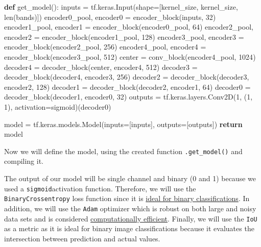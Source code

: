 \documentclass[
  letterpaper,
  DIV=11,
  numbers=noendperiod]{scrreprt}
\newenvironment{Shaded}{\begin{snugshade}}{\end{snugshade}}
\newcommand{\BuiltInTok}[1]{\textcolor[rgb]{0.00,0.23,0.31}{#1}}
\newcommand{\ControlFlowTok}[1]{\textcolor[rgb]{0.00,0.23,0.31}{\textbf{#1}}}
\newcommand{\DecValTok}[1]{\textcolor[rgb]{0.68,0.00,0.00}{#1}}
\newcommand{\KeywordTok}[1]{\textcolor[rgb]{0.00,0.23,0.31}{\textbf{#1}}}
\newcommand{\NormalTok}[1]{\textcolor[rgb]{0.00,0.23,0.31}{#1}}
\newcommand{\OperatorTok}[1]{\textcolor[rgb]{0.37,0.37,0.37}{#1}}
\newcommand{\StringTok}[1]{\textcolor[rgb]{0.13,0.47,0.30}{#1}}
\begin{document}
\begin{Shaded}
\begin{Highlighting}[]
\KeywordTok{def}\NormalTok{ get\_model():}
\NormalTok{    inputs }\OperatorTok{=}\NormalTok{ tf.keras.Input(shape}\OperatorTok{=}\NormalTok{[kernel\_size, kernel\_size, }\BuiltInTok{len}\NormalTok{(bands)])}
\NormalTok{    encoder0\_pool, encoder0 }\OperatorTok{=}\NormalTok{ encoder\_block(inputs, }\DecValTok{32}\NormalTok{)}
\NormalTok{    encoder1\_pool, encoder1 }\OperatorTok{=}\NormalTok{ encoder\_block(encoder0\_pool, }\DecValTok{64}\NormalTok{)}
\NormalTok{    encoder2\_pool, encoder2 }\OperatorTok{=}\NormalTok{ encoder\_block(encoder1\_pool, }\DecValTok{128}\NormalTok{)}
\NormalTok{    encoder3\_pool, encoder3 }\OperatorTok{=}\NormalTok{ encoder\_block(encoder2\_pool, }\DecValTok{256}\NormalTok{)}
\NormalTok{    encoder4\_pool, encoder4 }\OperatorTok{=}\NormalTok{ encoder\_block(encoder3\_pool, }\DecValTok{512}\NormalTok{)}
\NormalTok{    center }\OperatorTok{=}\NormalTok{ conv\_block(encoder4\_pool, }\DecValTok{1024}\NormalTok{)}
\NormalTok{    decoder4 }\OperatorTok{=}\NormalTok{ decoder\_block(center, encoder4, }\DecValTok{512}\NormalTok{)}
\NormalTok{    decoder3 }\OperatorTok{=}\NormalTok{ decoder\_block(decoder4, encoder3, }\DecValTok{256}\NormalTok{)}
\NormalTok{    decoder2 }\OperatorTok{=}\NormalTok{ decoder\_block(decoder3, encoder2, }\DecValTok{128}\NormalTok{)}
\NormalTok{    decoder1 }\OperatorTok{=}\NormalTok{ decoder\_block(decoder2, encoder1, }\DecValTok{64}\NormalTok{)}
\NormalTok{    decoder0 }\OperatorTok{=}\NormalTok{ decoder\_block(decoder1, encoder0, }\DecValTok{32}\NormalTok{)}
\NormalTok{    outputs }\OperatorTok{=}\NormalTok{ tf.keras.layers.Conv2D(}\DecValTok{1}\NormalTok{, (}\DecValTok{1}\NormalTok{, }\DecValTok{1}\NormalTok{), activation}\OperatorTok{=}\StringTok{\textquotesingle{}sigmoid\textquotesingle{}}\NormalTok{)(decoder0)}

\NormalTok{    model }\OperatorTok{=}\NormalTok{ tf.keras.models.Model(inputs}\OperatorTok{=}\NormalTok{[inputs], outputs}\OperatorTok{=}\NormalTok{[outputs])}
    \ControlFlowTok{return}\NormalTok{ model}
\end{Highlighting}
\end{Shaded}

Now we will define the model, using the created function
\texttt{.get\_model()} and compiling it.

The output of our model will be single channel and binary (0 and 1)
because we used a \texttt{sigmoid}activation function. Therefore, we
will use the \texttt{BinaryCrossentropy} loss function since it is
\href{https://keras.io/api/losses/probabilistic_losses/}{ideal for
binary classifications}. In addition, we will use the \texttt{Adam}
optimizer which is robust on both large and noisy data sets and is
considered \href{http://arxiv.org/abs/1412.6980}{computationally
efficient}. Finally, we will use the \texttt{IoU} as a metric as it is
ideal for binary image classifications because it evaluates the
intersection between prediction and actual values.
\end{document}
